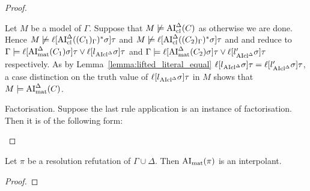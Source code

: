 \documentclass[,%
	draft=false,%
	numbers=noendperiod
	oneside,openany
	a4paper,
	11pt,
]{memoir}
\begin{document}
\begin{proof}
\begin{description}
\begin{enumerate}
					Let $M$ be a model of $\Gamma$. Suppose that $M \not\models \operatorname{AI}_\mathrm{cl}^\Delta(C)$ as otherwise we are done. Hence $M \not\models \ell[\operatorname{AI}_\mathrm{cl}^\Delta((C_1)_\Gamma)^*\sigma]\tau$ and $M \not\models \ell[\operatorname{AI}_\mathrm{cl}^\Delta((C_2)_\Gamma)^*\sigma]\tau$ and \markA{} and \markB{} reduce to 
					$\Gamma \models \ell[\operatorname{AI}_\mathrm{mat}^\Delta(C_1)\sigma]\tau \lor \ell[l{_{\operatorname{AIcl}^\Delta}}\sigma]\tau$ 
					and 
					$\Gamma \models \ell[\operatorname{AI}_\mathrm{mat}^\Delta(C_2)\sigma]\tau \lor \ell[l{_{\operatorname{AIcl}^\Delta}'}\sigma]\tau$ respectively.
					As by Lemma~\ref{lemma:lifted_literal_equal} $\ell[l{_{\operatorname{AIcl}^\Delta}}\sigma]\tau = \ell[l{_{\operatorname{AIcl}^\Delta}'}\sigma]\tau$, a case distinction on the truth value of $\ell[l{_{\operatorname{AIcl}^\Delta}}\sigma]\tau$ in $M$ shows that $M\models \operatorname{AI}_\mathrm{mat}^\Delta(C)$.


			\end{enumerate}



		\item{Factorisation.}
			Suppose the last rule application is an instance of factorisation. Then it is of the following form:
			\begin{prooftree}
			\end{prooftree}


	\end{description}

\end{proof}


\label{sec:arrow_quantifier_block} 

\begin{thm}
	Let $\pi$ be a resolution refutation of $\Gamma\cup\Delta$.
	Then $\operatorname{AI}_\mathrm{mat}( \pi )$ is an interpolant.
\end{thm}
\begin{proof}
\end{proof}
\end{document}
